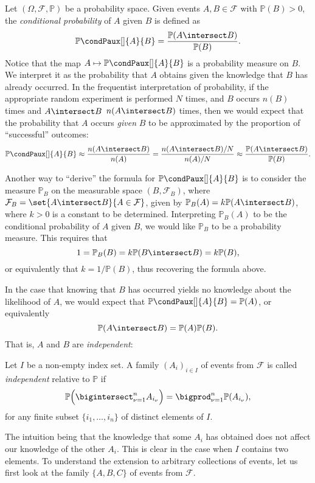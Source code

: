 \documentclass[article, a4paper, 11pt, oneside]{memoir}
\numberwithin{equation}{chapter}
\newcommand{\calF}{\mathcal{F}}
\renewcommand{\P}{\mathbb{P}}
\newcommand{\condP}[3][]{{\P\condPaux[#1]{#2}{#3}}}
\begin{document}
Let $(\Omega,\calF,\P)$ be a probability space. Given events $A,B \in \calF$ with $\P(B) > 0$, the \emph{conditional probability} of $A$ given $B$ is defined as
%
\begin{equation*}
    \condP{A}{B}
        = \frac{ \P(A \intersect B) }{ \P(B) }.
\end{equation*}
%
Notice that the map $A \mapsto \condP{A}{B}$ is a probability measure on $B$. We interpret it as the probability that $A$ obtains given the knowledge that $B$ has already occurred. In the frequentist interpretation of probability, if the appropriate random experiment is performed $N$ times, and $B$ occurs $n(B)$ times and $A \intersect B$ $n(A \intersect B)$ times, then we would expect that the probability that $A$ occurs \emph{given} $B$ to be approximated by the proportion of \enquote{successful} outcomes:
%
\begin{equation*}
    \condP{A}{B}
        \approx \frac{n(A \intersect B)}{n(A)}
        = \frac{n(A \intersect B)/N}{n(A)/N}
        \approx \frac{\P(A \intersect B)}{\P(B)}.
\end{equation*}

Another way to \enquote{derive} the formula for $\condP{A}{B}$ is to consider the measure $\P_B$ on the measurable space $(B,\calF_B)$, where $\calF_B = \set{A \intersect B}{A \in \calF}$, given by $\P_B(A) = k \P(A \intersect B)$, where $k > 0$ is a constant to be determined. Interpreting $\P_B(A)$ to be the conditional probability of $A$ given $B$, we would like $\P_B$ to be a probability measure. This requires that
%
\begin{equation*}
    1
        = \P_B(B)
        = k \P(B \intersect B)
        = k \P(B),
\end{equation*}
%
or equivalently that $k = 1/\P(B)$, thus recovering the formula above.

In the case that knowing that $B$ has occurred yields no knowledge about the likelihood of $A$, we would expect that $\condP{A}{B} = \P(A)$, or equivalently
%
\begin{equation*}
    \P(A \intersect B) = \P(A) \P(B).
\end{equation*}
%
That is, $A$ and $B$ are \emph{independent}:

\begin{definition}[Independence I]
    \label{def:independence-1}
    Let $I$ be a non-empty index set. A family $(A_i)_{i \in I}$ of events from $\calF$ is called \emph{independent} relative to $\P$ if
    \begin{equation*}
        \P \Bigl( \bigintersect_{\nu = 1}^n A_{i_\nu} \Bigr)
            = \bigprod_{\nu = 1}^n \P(A_{i_\nu}),
    \end{equation*}
    for any finite subset $\{ i_1, \ldots, i_n \}$ of distinct elements of $I$.
\end{definition}
%
The intuition being that the knowledge that some $A_i$ has obtained does not affect our knowledge of the other $A_i$. This is clear in the case when $I$ contains two elements. To understand the extension to arbitrary collections of events, let us first look at the family $\{A, B, C\}$ of events from $\calF$.
\end{document}
